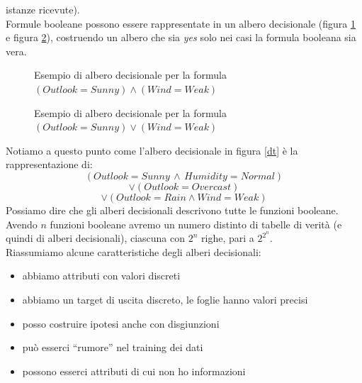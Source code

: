 \documentclass[a4paper,12pt, oneside]{book}
\begin{document}
istanze ricevute).\\
Formule booleane possono essere rappresentate in un albero decisionale (figura
\ref{dt2} e figura \ref{dt3}), costruendo un albero che sia \textit{yes}
solo nei casi la formula booleana 
sia vera.
\begin{figure}[H]
  \centering
  \caption{Esempio di albero decisionale per la formula $(Outlook=Sunny)\land
    (Wind=Weak)$} 
  \label{dt2}
\end{figure}
\begin{figure}[H]
  \centering
  \caption{Esempio di albero decisionale  per la formula $(Outlook=Sunny)\lor
    (Wind=Weak)$}
  \label{dt3}
\end{figure}
Notiamo a questo punto come l'albero decisionale in figura \ref{dt} è la
rappresentazione di:
\[(Outlook=Sunny\,\land\, Humidity=Normal)\]
\[\lor(Outlook=Overcast)\]
\[\lor(Outlook=Rain \land Wind=Weak) \] 
Possiamo dire che gli alberi decisionali descrivono tutte le funzioni
booleane. Avendo $n$ funzioni booleane avremo un numero distinto di tabelle di
verità (e quindi di alberi decisionali), ciascuna con $2^n$ righe, pari a
$2^{2^{n}}$.\\
Riassumiamo alcune caratteristiche degli alberi decisionali:
\begin{itemize}
  \item abbiamo attributi con valori discreti
  \item abbiamo un target di uscita discreto, le foglie hanno valori precisi
  \item posso costruire ipotesi anche con disgiunzioni
  \item può esserci ``rumore'' nel training dei dati
  \item possono esserci attributi di cui non ho informazioni
\end{itemize}
\end{document}
